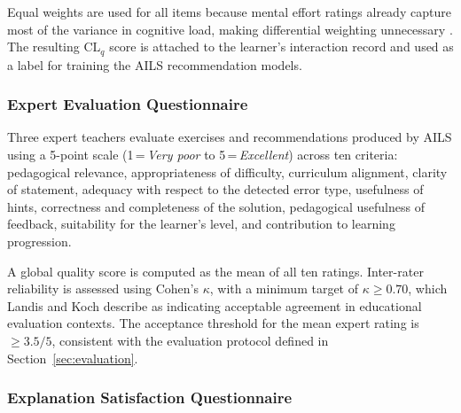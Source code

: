 \documentclass[ASNA,twocolumn]{USG} %
\begin{document}
Equal weights are used for all items because mental effort ratings
already capture most of the variance in cognitive load, making
differential weighting unnecessary \cite{Paas2003}.
The resulting $\text{CL}_q$ score is attached to the learner's
interaction record and used as a label for training the AILS
recommendation models.




\subsubsection{Expert Evaluation Questionnaire}

Three expert teachers evaluate exercises and recommendations produced
by AILS using a 5-point scale (1\,=\,\emph{Very poor} to
5\,=\,\emph{Excellent}) across ten criteria: pedagogical relevance,
appropriateness of difficulty, curriculum alignment, clarity of
statement, adequacy with respect to the detected error type,
usefulness of hints, correctness and completeness of the solution,
pedagogical usefulness of feedback, suitability for the learner's
level, and contribution to learning progression.

A global quality score is computed as the mean of all ten ratings.
Inter-rater reliability is assessed using Cohen's $\kappa$, with a
minimum target of $\kappa \geq 0.70$, which Landis and Koch
\cite{Landis1977} describe as indicating acceptable agreement in
educational evaluation contexts. The acceptance threshold for the
mean expert rating is $\geq 3.5/5$, consistent with the evaluation
protocol defined in Section~\ref{sec:evaluation}.

\subsubsection{Explanation Satisfaction Questionnaire}
\end{document}
